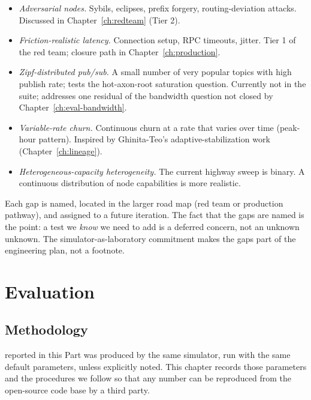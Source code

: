 \documentclass[twoside,nobib]{tufte-book}
\begin{document}
\begin{itemize}\setlength\itemsep{0.15em}
  \item \emph{Adversarial nodes.} Sybils, eclipses, prefix
    forgery, routing-deviation attacks. Discussed in
    Chapter~\ref{ch:redteam} (Tier 2).
  \item \emph{Friction-realistic latency.} Connection setup,
    RPC timeouts, jitter. Tier 1 of the red team; closure path
    in Chapter~\ref{ch:production}.
  \item \emph{Zipf-distributed pub/sub.} A small number of
    very popular topics with high publish rate; tests the
    hot-axon-root saturation question. Currently not in the
    suite; addresses one residual of the bandwidth question
    not closed by Chapter~\ref{ch:eval-bandwidth}.
  \item \emph{Variable-rate churn.} Continuous churn at a
    rate that varies over time (peak-hour pattern). Inspired
    by Ghinita-Teo's adaptive-stabilization work
    (Chapter~\ref{ch:lineage}).
  \item \emph{Heterogeneous-capacity heterogeneity.} The
    current highway sweep is binary. A continuous distribution
    of node capabilities is more realistic.
\end{itemize}

Each gap is named, located in the larger road map (red team or
production pathway), and assigned to a future iteration. The
fact that the gaps are named is the point: a test we
\emph{know} we need to add is a deferred concern, not an
unknown unknown. The simulator-as-laboratory commitment makes
the gaps part of the engineering plan, not a footnote.


\part{Evaluation}


\chapter{Methodology}
\label{ch:eval-method}

 reported in this Part was produced
by the same simulator, run with the same default parameters,
unless explicitly noted. This chapter records those parameters and
the procedures we follow so that any number can be reproduced from
the open-source code base by a third party.
\end{document}
